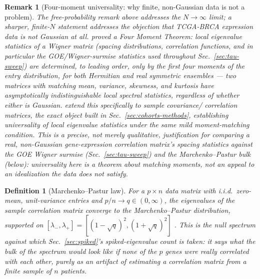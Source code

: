 \documentclass[11pt]{article}
\newtheorem{definition}{Definition}
\newtheorem{remark}{Remark}
\begin{document}
\begin{remark}[Four-moment universality: why finite, non-Gaussian data is not a problem]
The free-probability remark above addresses the $N\to\infty$ limit;
a sharper, finite-$N$ statement addresses the objection that TCGA-BRCA
expression data is not Gaussian at all. \citet{taovu2011} proved a
Four Moment Theorem: local eigenvalue statistics of a Wigner
matrix (spacing distributions, correlation functions, and in
particular the GOE/Wigner-surmise statistics used throughout
Sec.~\ref{sec:tau-sweep}) are determined, to leading order, only by
the first four moments of the entry distribution, for both Hermitian
and real symmetric ensembles --- two matrices with matching mean,
variance, skewness, and kurtosis have asymptotically indistinguishable
local spectral statistics, regardless of whether either is Gaussian.
\citet{taovu2012} extend this specifically to sample covariance/
correlation matrices, the exact object built in
Sec.~\ref{sec:cohorts-methods}, establishing universality of local
eigenvalue statistics under the same mild moment-matching condition.
This is a precise, not merely qualitative, justification for
comparing a real, non-Gaussian gene-expression correlation matrix's
spacing statistics against the GOE Wigner surmise (Sec.~\ref{sec:tau-sweep})
and the Marchenko--Pastur bulk (below): universality here is a theorem
about matching moments, not an appeal to an idealization the data does
not satisfy.
\end{remark}

\begin{definition}[Marchenko--Pastur law]
For a $p\times n$ data matrix with i.i.d.\ zero-mean, unit-variance
entries and $p/n\to q\in(0,\infty)$, the eigenvalues of the sample
correlation matrix converge to the Marchenko--Pastur distribution,
supported on $[\lambda_-,\lambda_+]=[(1-\sqrt q)^2,(1+\sqrt q)^2]$
\citep{marchenkopastur1967}. This is the null spectrum against which
Sec.~\ref{sec:spiked}'s spiked-eigenvalue count is taken: it says what
the bulk of the spectrum would look like if none of the $p$ genes were
really correlated with each other, purely as an artifact of estimating
a correlation matrix from a finite sample of $n$ patients.
\end{definition}
\end{document}
